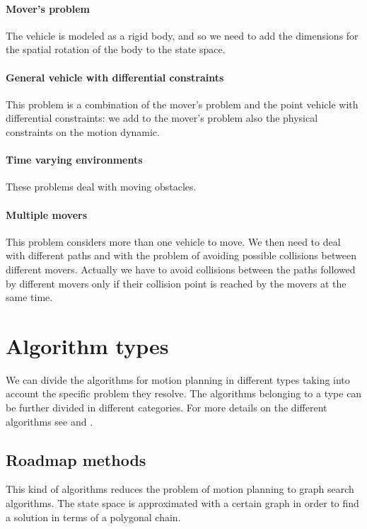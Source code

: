 \documentclass[dissertation.tex]{subfiles}
\begin{document}
\paragraph{Mover's problem}
The vehicle is modeled as a rigid body, and so we need to add the
dimensions for the spatial rotation of the body to the state
space.

\paragraph{General vehicle with differential constraints}
This problem is a combination of the mover's problem and the point vehicle with
differential constraints: we add to the mover's
problem also the physical constraints on the motion dynamic.

\paragraph{Time varying environments}
These problems deal with moving obstacles.

\paragraph{Multiple movers}
This problem considers more than one vehicle to move. We then need to deal
with different paths and with the problem of avoiding possible
collisions between different movers. Actually we have to avoid
collisions between the paths followed by different movers only if
their collision point is reached by the movers at the same time.

\section{Algorithm types}
We can divide the algorithms for motion planning in different types
taking into account the specific problem they resolve. The algorithms
belonging to a type can be further divided
in different categories.
For more details on the different algorithms see \cite{goerzen} and
\cite{choset}.

\subsection{Roadmap methods}
This kind of algorithms reduces the problem of motion planning to
graph search algorithms. The state space is approximated with a
certain graph in order to find a solution in terms of a polygonal
chain.
\end{document}
